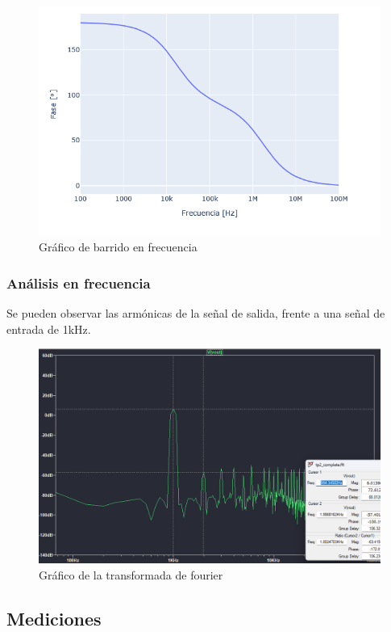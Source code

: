 \begin{figure}[h!]
    \centering
    \includegraphics[width=0.85\linewidth]{img/TP2_1_grafico_bode_fase.png}
    \caption{Gráfico de barrido en frecuencia}
    \label{fig:bode1a}
\end{figure}

\subsubsection{Análisis en frecuencia }

Se pueden observar las armónicas de la señal de salida, frente a una señal de entrada de 1kHz.
\begin{figure}[h!]
    \centering
    \includegraphics[width=1.0\linewidth]{img/ftt1a.png}
    \caption{Gráfico de la transformada de fourier}
    \label{fig:fft1a}
\end{figure}

\subsection{Mediciones}

